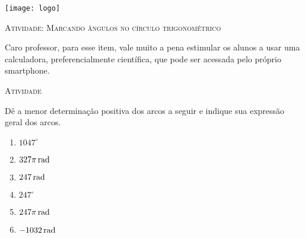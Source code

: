 \documentclass[10 pt,usenames,dvipsnames, oneside]{article}
\begin{document}
\begin{center}
  \begin{minipage}[l]{3cm}
\texttt{[image: logo]}    
\end{minipage}\hfill
\begin{minipage}[r]{.8\textwidth}
 {\Large \scshape Atividade: Marcando ângulos no círculo trigonométrico}  
\end{minipage}
\end{center}
\vspace{.2cm}

\ifdefined\prof

\begin{sugestions}
\vspace{1em}
Caro professor, para esse item, vale muito a pena estimular os alunos a usar uma calculadora, preferencialmente científica, que pode ser acessada pelo próprio smartphone.

\end{sugestions}

\bigskip
\begin{center}
{\large \scshape Atividade}
\end{center}
\fi

Dê a menor determinação positiva dos arcos a seguir e indique sua expressão geral dos arcos.
\begin{enumerate}
\item $1047^{\circ}$
\item $327\pi\operatorname{rad}$
\item $247\operatorname{rad}$
\item $247^{\circ}$
\item $247\pi\operatorname{rad}$
\item $-1032\operatorname{rad}$
\end{enumerate}
\end{document}
